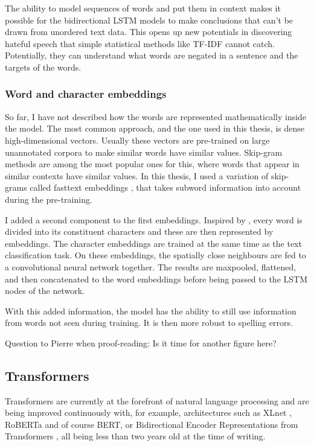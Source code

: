 \documentclass[nofilelist]{cslthse-msc}
\begin{document}
The ability to model sequences of words and put them in context makes it possible for the bidirectional LSTM models to make conclusions that can't be drawn from unordered text data. This opens up new potentials in discovering hateful speech that simple statistical methods like TF-IDF cannot catch. Potentially, they can understand what words are negated in a sentence and the targets of the words.

\subsubsection{Word and character embeddings}

So far, I have not described how the words are represented mathematically inside the model. The most common approach, and the one used in this thesis, is dense high-dimensional vectors. Usually these vectors are pre-trained on large unannotated corpora to make similar words have similar values. Skip-gram methods \citep{mikolov2013efficient} are among the most popular ones for this, where words that appear in similar contexts have similar values. In this thesis, I used  a variation of skip-grams called fasttext embeddings \citet{bojanowski2017enriching}, that takes subword information into account during the pre-training.

I added a second component to the first embeddings. Inspired by \citet{DBLP:journals/corr/ChiuN15}, every word is divided into its constituent characters and these are then represented by embeddings. The character embeddings are trained at the same time as the text classification task. On these embeddings, the spatially close neighbours are fed to a convolutional neural network together. The results are maxpooled, flattened, and then concatenated to the word embeddings before being passed to the LSTM nodes of the network. 

With this added information, the model has the ability to still use information from words not seen during training. It is then more robust to spelling errors.

Question to Pierre when proof-reading: Is it time for another figure here?

\subsection{Transformers}

Transformers are currently at the forefront of natural language processing and are being improved continuously with, for example, architectures such as XLnet \citep{DBLP:journals/corr/abs-1906-08237}, RoBERTa \citep{DBLP:journals/corr/abs-1907-11692} and of course BERT, or Bidirectional Encoder Representations from Transformers \citep{DBLP:journals/corr/abs-1810-04805}, all being less than two years old at the time of writing. 
\end{document}
